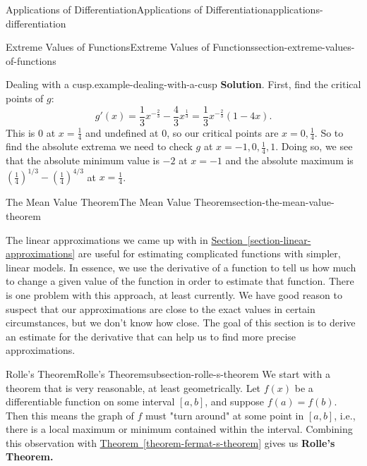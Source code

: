 \documentclass[oneside,10pt,]{book}
\newcommand{\terminology}[1]{\textbf{#1}}
\numberwithin{equation}{section}
\begin{document}
\begin{chapterptx}{Applications of Differentiation}{}{Applications of Differentiation}{}{}{applications-differentiation}
\begin{sectionptx}{Extreme Values of Functions}{}{Extreme Values of Functions}{}{}{section-extreme-values-of-functions}
\begin{example}{Dealing with a cusp.}{example-dealing-with-a-cusp}
\noindent\textbf{Solution}.\hypertarget{solution-72}{}\quad%
\hypertarget{p-327}{}%
First, find the critical points of \(g\):%
\begin{equation*}
g'(x) = \frac{1}{3}x^{-\frac{2}{3}} - \frac{4}{3}x^{\frac{1}{3}} = \frac{1}{3}x^{-\frac{2}{3}}(1 - 4x).
\end{equation*}
This is \(0\) at \(x = \frac{1}{4}\) and undefined at \(0\), so our critical points are \(x=0,\frac{1}{4}\). So to find the absolute extrema we need to check \(g\) at \(x=-1,0,\frac{1}{4},1\). Doing so, we see that the absolute minimum value is \(-2\) at \(x=-1\) and the absolute maximum is \((\frac{1}{4})^{1/3} - (\frac{1}{4})^{4/3}\) at \(x = \frac{1}{4}\).%
\end{example}
\end{sectionptx}
%
%
\typeout{************************************************}
\typeout{************************************************}
%
\begin{sectionptx}{The Mean Value Theorem}{}{The Mean Value Theorem}{}{}{section-the-mean-value-theorem}
\begin{introduction}{}%
\hypertarget{p-328}{}%
The linear approximations we came up with in \hyperref[section-linear-approximations]{Section~\ref{section-linear-approximations}} are useful for estimating complicated functions with simpler, linear models. In essence, we use the derivative of a function to tell us how much to change a given value of the function in order to estimate that function. There is one problem with this approach, at least currently. We have good reason to suspect that our approximations are close to the exact values in certain circumstances, but we don't know how close. The goal of this section is to derive an estimate for the derivative that can help us to find more precise approximations.%
\end{introduction}%
%
%
\typeout{************************************************}
\typeout{************************************************}
%
\begin{subsectionptx}{Rolle's Theorem}{}{Rolle's Theorem}{}{}{subsection-rolle-s-theorem}
\hypertarget{p-329}{}%
We start with a theorem that is very reasonable, at least geometrically. Let \(f(x)\) be a differentiable function on some interval \([a,b]\), and suppose \(f(a) = f(b)\). Then this means the graph of \(f\) must "turn around" at some point in \([a,b]\), i.e., there is a local maximum or minimum contained within the interval. Combining this observation with \hyperref[theorem-fermat-s-theorem]{Theorem~\ref{theorem-fermat-s-theorem}} gives us \terminology{Rolle's Theorem.}%

\end{subsectionptx}
\end{sectionptx}
\end{chapterptx}
\end{document}
